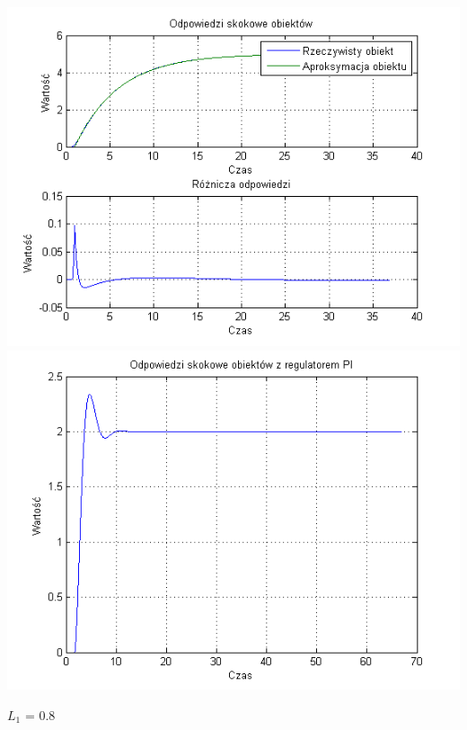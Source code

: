 \documentclass[10pt,a4paper]{article}
\begin{document}
\begin{center}
\includegraphics[scale=1]{images/jeden/skrypt_201.png}\\
\includegraphics[scale=1]{images/jeden/skrypt_202.png}\\
\end{center}
\newpage
$L_1$ = 0.8
\end{document}
